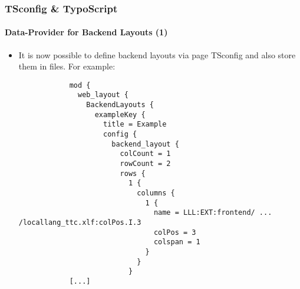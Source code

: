 %
\begin{frame}[fragile]
	\frametitle{TSconfig \& TypoScript}
	\framesubtitle{Data-Provider for Backend Layouts (1)}

	\lstset{basicstyle=\tiny\ttfamily}

	\begin{itemize}
		\item It is now possible to define backend layouts via page TSconfig and also store them in files. For example:

		\begin{lstlisting}
			mod {
			  web_layout {
			    BackendLayouts {
			      exampleKey {
			        title = Example
			        config {
			          backend_layout {
			            colCount = 1
			            rowCount = 2
			            rows {
			              1 {
			                columns {
			                  1 {
			                    name = LLL:EXT:frontend/ ... /locallang_ttc.xlf:colPos.I.3
			                    colPos = 3
			                    colspan = 1
			                  }
			                }
			              }
			[...]
		\end{lstlisting}

	\end{itemize}

\end{frame}


